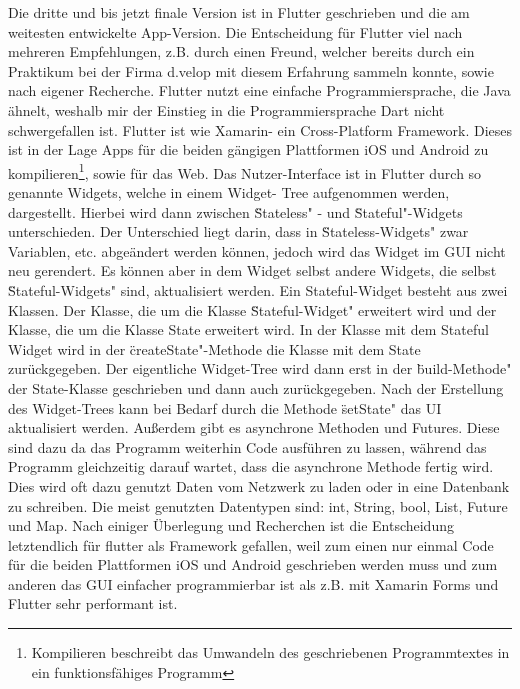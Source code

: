     Die dritte und bis jetzt finale Version ist in Flutter geschrieben und die am weitesten 
    entwickelte App-Version. Die Entscheidung für Flutter viel nach mehreren Empfehlungen, 
    z.B. durch einen Freund, welcher bereits durch ein Praktikum bei der Firma d.velop mit 
    diesem Erfahrung sammeln konnte, sowie nach eigener Recherche. Flutter nutzt eine 
    einfache Programmiersprache, die Java ähnelt, weshalb mir der Einstieg in die 
    Programmiersprache Dart\cite{Dart} nicht schwergefallen ist. Flutter ist wie Xamarin-
    ein Cross-Platform Framework. Dieses ist in der Lage Apps für die beiden gängigen 
    Plattformen iOS und Android zu kompilieren\footnote{Kompilieren beschreibt das Umwandeln
    des geschriebenen Programmtextes in ein funktionsfähiges Programm}, sowie für das Web.
    Das Nutzer-Interface ist in Flutter durch so genannte Widgets, welche in einem Widget-
    Tree aufgenommen werden, dargestellt. Hierbei wird dann zwischen \"Stateless"
    \cite{Stateless-Widget}- und \"Stateful"\cite{Stateful-Widget}-Widgets unterschieden. 
    Der Unterschied liegt darin, dass in \"Stateless-Widgets" zwar Variablen, etc. abgeändert 
    werden können, jedoch wird das Widget im GUI nicht neu gerendert. Es können aber in dem 
    Widget selbst andere Widgets, die selbst \"Stateful-Widgets" sind, aktualisiert werden.
    Ein Stateful-Widget besteht aus zwei Klassen. Der Klasse, die um die Klasse 
    \"Stateful-Widget" erweitert wird und der Klasse, die um die Klasse 
    State\cite{State} erweitert wird. In der Klasse mit dem Stateful Widget wird in der
    \"createState"-Methode die Klasse mit dem State zurückgegeben. Der eigentliche Widget-Tree
    wird dann erst in der \"build-Methode" der State-Klasse geschrieben und dann auch 
    zurückgegeben. Nach der Erstellung des Widget-Trees kann bei Bedarf durch die Methode 
    \"setState" das UI aktualisiert werden. Außerdem gibt es asynchrone Methoden und 
    Futures\cite{Futures}. Diese sind dazu da das Programm weiterhin Code ausführen zu lassen,
    während das Programm gleichzeitig darauf wartet, dass die asynchrone Methode fertig wird. 
    Dies wird oft dazu genutzt Daten vom Netzwerk zu laden oder in eine Datenbank zu 
    schreiben. Die meist genutzten Datentypen sind: int, String, bool, List, Future und Map.
    Nach einiger Überlegung und Recherchen ist die Entscheidung letztendlich für flutter als 
    Framework gefallen, weil zum einen nur einmal Code für die beiden Plattformen iOS und 
    Android geschrieben werden muss und zum anderen das GUI einfacher programmierbar ist als 
    z.B. mit Xamarin Forms und Flutter sehr performant ist.